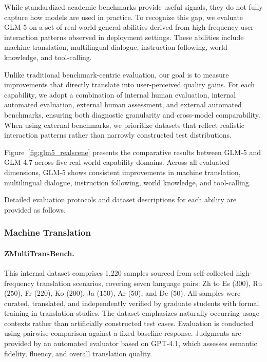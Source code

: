 While standardized academic benchmarks provide useful signals, they do not fully capture how models are used in practice. To recognize this gap, we evaluate GLM-5 on a set of real-world general abilities derived from high-frequency user interaction patterns observed in deployment settings. These abilities include {machine translation, multilingual dialogue, instruction following, world knowledge, and tool-calling}.

Unlike traditional benchmark-centric evaluation, our goal is to measure improvements that directly translate into user-perceived quality gains. For each capability, we adopt a combination of internal human evaluation, internal automated evaluation, external human assessment, and external automated benchmarks, ensuring both diagnostic granularity and cross-model comparability. When using external benchmarks, we prioritize datasets that reflect realistic interaction patterns rather than narrowly constructed test distributions.

Figure~\ref{fig:glm5_realscene} presents the comparative results between GLM-5 and GLM-4.7 across five real-world capability domains. Across all evaluated dimensions, GLM-5 shows consistent improvements in machine translation, multilingual dialogue, instruction following, world knowledge, and tool-calling.


Detailed evaluation protocols and dataset descriptions for each ability are provided as follows. %

\subsubsection{Machine Translation}

\paragraph{ZMultiTransBench.} 
This internal dataset comprises 1,220 samples sourced from self-collected high-frequency translation scenarios, covering seven language pairs: Zh to Es (\(300\)), Ru (\(250\)), Fr (\(220\)), Ko (\(200\)), Ja (\(150\)), Ar (\(50\)), and De (\(50\)). All samples were curated, translated, and independently verified by graduate students with formal training in translation studies. The dataset emphasizes naturally occurring usage contexts rather than artificially constructed test cases. Evaluation is conducted using pairwise comparison against a fixed baseline response. Judgments are provided by an automated evaluator based on GPT-4.1, which assesses semantic fidelity, fluency, and overall translation quality.


